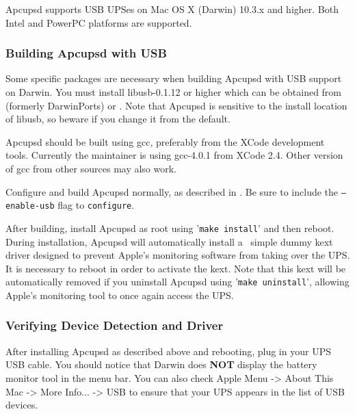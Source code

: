 Apcupsd supports USB UPSes on Mac OS X (Darwin) 10.3.x and higher. Both Intel
and PowerPC platforms are supported.

\subsubsection*{Building Apcupsd with USB}

Some specific packages are necessary when building Apcupsd with USB support
on Darwin. You must install libusb-0.1.12 or higher which can be obtained
from  (formerly DarwinPorts) or 
. Note that Apcupsd is
sensitive to the install location of libusb, so beware if you change it
from the default.

Apcupsd should be built using gcc, preferably from the XCode development
tools. Currently the maintainer is using gcc-4.0.1 from XCode 2.4. Other
version of gcc from other sources may also work.

Configure and build Apcupsd normally, as described in
.
Be sure to include the \texttt{{---}enable-usb} flag to \texttt{configure}.

After building, install Apcupsd as root using '\texttt{make install}' and
then reboot. During installation, Apcupsd will automatically install a \
simple dummy kext driver designed to prevent Apple's monitoring software
from taking over the UPS. It is necessary to reboot in order to activate
the kext. Note that this kext will be automatically removed if you
uninstall Apcupsd using '\texttt{make uninstall}', allowing Apple's
monitoring tool to once again access the UPS.

\subsubsection*{Verifying Device Detection and Driver}

After installing Apcupsd as described above and rebooting, plug in your
UPS USB cable. You should notice that Darwin does {\bf NOT} display the
battery monitor tool in the menu bar. You can also check Apple Menu ->
About This Mac -> More Info... -> USB to ensure that your UPS
appears in the list of USB devices.


